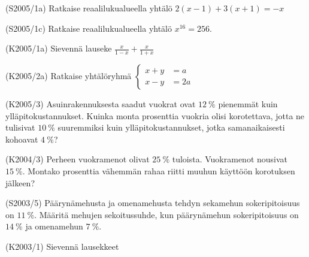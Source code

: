 \begin{tehtava}(S2005/1a)  Ratkaise reaalilukualueella yhtälö 
                       $ 2(x - 1) + 3(x + 1 ) = -x $
\end{tehtava}

\begin{tehtava}(S2005/1c)  Ratkaise reaalilukualueella yhtälö $ x^{16} = 256 $.
\end{tehtava}

\begin{tehtava}(K2005/1a)  Sievennä lauseke
                        $ \frac{x}{1 - x} + \frac{x}{1 + x} $
\end{tehtava}

\begin{tehtava}(K2005/2a)  Ratkaise yhtälöryhmä
                      $
                        \left\{
                        \begin{aligned}
                             x + y &= a \\
                             x - y &= 2a
                        \end{aligned}
                        \right.
                    $
\end{tehtava}

\begin{tehtava}(K2005/3)   Asuinrakennuksesta saadut vuokrat ovat $12~\%$ pienemmät kuin
                        ylläpitokustannukset. Kuinka monta prosenttia vuokria olisi
                        korotettava, jotta ne tulisivat $10~\%$ suuremmiksi kuin 
                        ylläpitokustannukset, jotka samanaikaisesti kohoavat $4~\%$?
\end{tehtava}

\begin{tehtava}(K2004/3)   Perheen vuokramenot olivat $25~\%$ tuloista. Vuokramenot nousivat
                        $15~\%$. Montako prosenttia vähemmän rahaa riitti muuhun
                        käyttöön korotuksen jälkeen?
\end{tehtava}

\begin{tehtava}(S2003/5)   Päärynämehusta ja omenamehusta tehdyn sekamehun sokeripitoisuus
                        on $11~\%$. Määritä mehujen sekoitussuhde, kun päärynämehun
                        sokeripitoisuus on $14~\%$ ja omenamehun $7~\%$.
\end{tehtava}


\begin{tehtava}(K2003/1)   Sievennä lausekkeet
        \begin{alakohdat}
        \end{alakohdat}
\end{tehtava}

